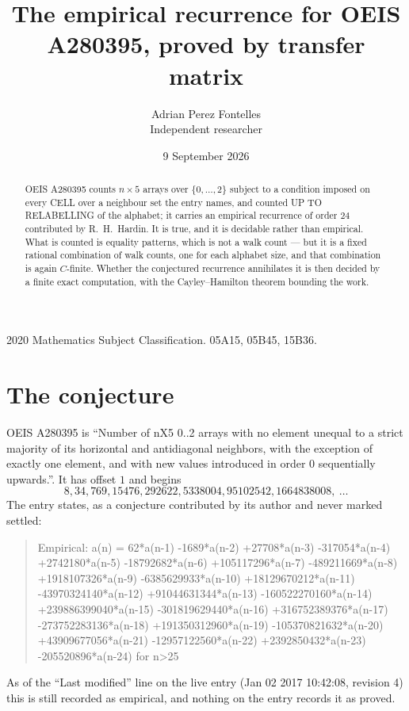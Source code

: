 \documentclass[11pt,a4paper]{article}
\title{The empirical recurrence for OEIS A280395, proved by transfer matrix}
\author{Adrian Perez Fontelles\\ \small Independent researcher}
\date{9 September 2026}
\theoremstyle{plain}
\theoremstyle{definition}
\begin{document}
\maketitle

\begin{abstract}
OEIS A280395 counts $n\times5$ arrays over $\{0,\dots,2\}$ subject to a condition imposed on
every CELL over a neighbour set the entry names, and counted UP TO RELABELLING of the
alphabet; it carries an empirical recurrence of order $24$ contributed by
R.~H.~Hardin. It is true, and it is decidable rather than empirical. What is counted is
equality patterns, which is not a walk count --- but it is a fixed rational combination of
walk counts, one for each alphabet size, and that combination is again $C$-finite. Whether the
conjectured recurrence annihilates it is then decided by a finite exact computation, with the
Cayley--Hamilton theorem bounding the work.
\end{abstract}

\noindent\small 2020 Mathematics Subject Classification. 05A15, 05B45, 15B36.\normalsize

\section{The conjecture}

OEIS A280395 is ``Number of nX5 0..2 arrays with no element unequal to a strict majority of its horizontal and antidiagonal neighbors, with the exception of exactly one element, and with new values introduced in order 0 sequentially upwards.''. It has offset $1$ and begins
\[
8, 34, 769, 15476, 292622, 5338004, 95102542, 1664838008,\ \dots
\]
The entry states, as a conjecture contributed by its author and never marked settled:
\begin{quote}
Empirical: a(n) = 62*a(n-1) -1689*a(n-2) +27708*a(n-3) -317054*a(n-4) +2742180*a(n-5) -18792682*a(n-6) +105117296*a(n-7) -489211669*a(n-8) +1918107326*a(n-9) -6385629933*a(n-10) +18129670212*a(n-11) -43970324140*a(n-12) +91044631344*a(n-13) -160522270160*a(n-14) +239886399040*a(n-15) -301819629440*a(n-16) +316752389376*a(n-17) -273752283136*a(n-18) +191350312960*a(n-19) -105370821632*a(n-20) +43909677056*a(n-21) -12957122560*a(n-22) +2392850432*a(n-23) -205520896*a(n-24) for n>25
\end{quote}
As of the ``Last modified'' line on the live entry (Jan 02 2017 10:42:08, revision 4) this is still
recorded as empirical, and nothing on the entry records it as proved.
\end{document}
